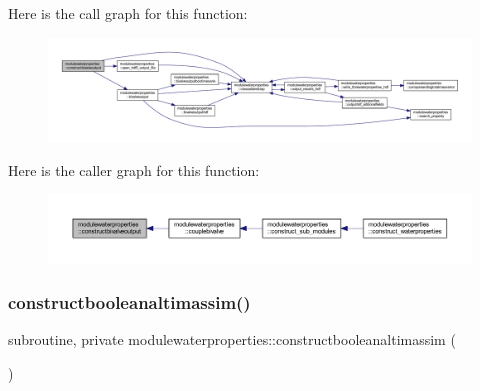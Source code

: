 Here is the call graph for this function\+:\nopagebreak
\begin{figure}[H]
\begin{center}
\leavevmode
\includegraphics[width=350pt]{namespacemodulewaterproperties_abe78da28c4264216e9c5f3d2e8a558f4_cgraph}
\end{center}
\end{figure}
Here is the caller graph for this function\+:\nopagebreak
\begin{figure}[H]
\begin{center}
\leavevmode
\includegraphics[width=350pt]{namespacemodulewaterproperties_abe78da28c4264216e9c5f3d2e8a558f4_icgraph}
\end{center}
\end{figure}
\mbox{\label{namespacemodulewaterproperties_a48d5c887c475fa7e3e29d35f55262ade}} 
\subsubsection{\texorpdfstring{constructbooleanaltimassim()}{constructbooleanaltimassim()}}
{\footnotesize\ttfamily subroutine, private modulewaterproperties\+::constructbooleanaltimassim (\begin{DoxyParamCaption}{ }\end{DoxyParamCaption})\hspace{0.3cm}{\ttfamily [private]}}

